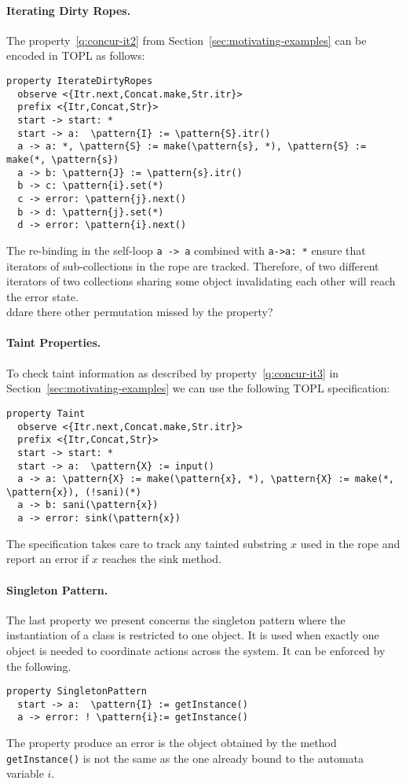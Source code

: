 \documentclass[9pt, preprint]{sigplanconf} %
\newcommand{\noterg}[2]{\textcolor{gray}{[\textcolor{red}{#1}: #2]}}
\newcommand{\dd}[1]{\noterg{dd}{#1}}
\newcommand{\delimitVerbatim}{\par\nobreak\smallskip\noindent}
\newcommand{\pattern}[1]{\ensuremath{\mathtt{\underline{#1}}}}
\theoremstyle{definition}
\theoremstyle{remark}
\begin{document}
\paragraph{Iterating Dirty Ropes.} %
The property~\eqref{q:concur-it2} from Section~\ref{sec:motivating-examples} can be encoded in TOPL as follows:
%
{\small
\delimitVerbatim
\begin{Verbatim}[commandchars=\\\{\}]
property IterateDirtyRopes
  observe <{Itr.next,Concat.make,Str.itr}>
  prefix <{Itr,Concat,Str}>
  start -> start: *
  start -> a:  \pattern{I} := \pattern{S}.itr()
  a -> a: *, \pattern{S} := make(\pattern{s}, *), \pattern{S} := make(*, \pattern{s})
  a -> b: \pattern{J} := \pattern{s}.itr()
  b -> c: \pattern{i}.set(*)
  c -> error: \pattern{j}.next()
  b -> d: \pattern{j}.set(*)
  d -> error: \pattern{i}.next()
\end{Verbatim}
\delimitVerbatim}
The re-binding in the self-loop {\tt a -> a} combined with {\tt a->a: *} ensure that iterators of sub-collections in the rope are tracked. Therefore,
of two different iterators of two collections sharing some object invalidating each other will reach the error state. 
\\dd{are there other permutation missed by the property?}

\paragraph{Taint Properties.} %
To check taint information as described by property~\eqref{q:concur-it3} in Section~\ref{sec:motivating-examples} we can use the following
TOPL specification:
{\small
\delimitVerbatim
\begin{Verbatim}[commandchars=\\\{\}]
property Taint
  observe <{Itr.next,Concat.make,Str.itr}>
  prefix <{Itr,Concat,Str}>
  start -> start: *
  start -> a:  \pattern{X} := input()
  a -> a: \pattern{X} := make(\pattern{x}, *), \pattern{X} := make(*, \pattern{x}), (!sani)(*)
  a -> b: sani(\pattern{x})
  a -> error: sink(\pattern{x})
\end{Verbatim}
\delimitVerbatim}
The specification takes care to track  any tainted substring $x$ used in the rope and report an error if $x$ reaches the sink method.

\paragraph{Singleton Pattern.} 
The last property we present concerns 
the singleton pattern where the instantiation of a class is restricted to one object. It is used when exactly one object is needed to coordinate actions across the system. It can be enforced by the following.
{\small
\delimitVerbatim
\begin{Verbatim}[commandchars=\\\{\}]
property SingletonPattern
  start -> a:  \pattern{I} := getInstance()
  a -> error: ! \pattern{i}:= getInstance()
\end{Verbatim}
\delimitVerbatim}
The property produce an error is the object obtained by the method {\tt getInstance()} is not the same as the one already bound to the automata variable $i$.
\end{document}
